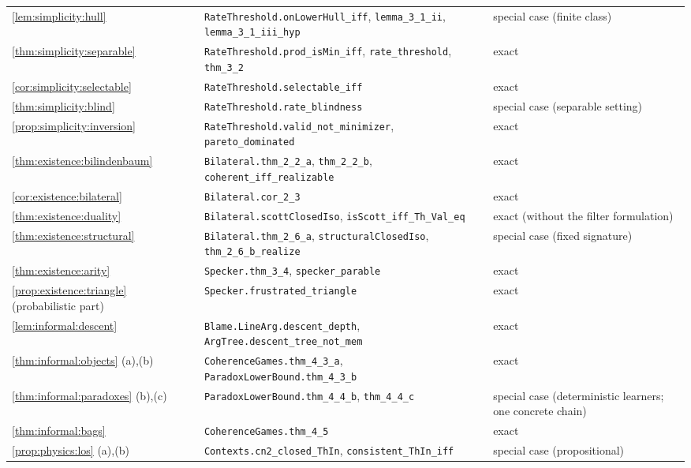 {\begin{longtable}{@{}>{\raggedright\arraybackslash}p{2.9cm}>{\raggedright\arraybackslash}p{7.6cm}>{\raggedright\arraybackslash}p{4.4cm}@{}}
\cref{lem:simplicity:hull} & \texttt{RateThreshold.\allowbreak onLowerHull\_iff}, \texttt{lemma\_3\_1\_ii}, \texttt{lemma\_3\_1\_iii\_hyp} & special case (finite class)\\
\cref{thm:simplicity:separable} & \texttt{RateThreshold.\allowbreak prod\_isMin\_iff}, \texttt{rate\_threshold}, \texttt{thm\_3\_2} & exact\\
\cref{cor:simplicity:selectable} & \texttt{RateThreshold.\allowbreak selectable\_iff} & exact\\
\cref{thm:simplicity:blind} & \texttt{RateThreshold.\allowbreak rate\_blindness} & special case (separable setting)\\
\cref{prop:simplicity:inversion} & \texttt{RateThreshold.\allowbreak valid\_not\_minimizer}, \texttt{pareto\_dominated} & exact\\
\cref{thm:existence:bilindenbaum} & \texttt{Bilateral.\allowbreak thm\_2\_2\_a}, \texttt{thm\_2\_2\_b}, \texttt{coherent\_iff\_realizable} & exact\\
\cref{cor:existence:bilateral} & \texttt{Bilateral.\allowbreak cor\_2\_3} & exact\\
\cref{thm:existence:duality} & \texttt{Bilateral.\allowbreak scottClosedIso}, \texttt{isScott\_iff\_Th\_Val\_eq} & exact (without the filter formulation)\\
\cref{thm:existence:structural} & \texttt{Bilateral.\allowbreak thm\_2\_6\_a}, \texttt{structuralClosedIso}, \texttt{thm\_2\_6\_b\_realize} & special case (fixed signature)\\
\cref{thm:existence:arity} & \texttt{Specker.\allowbreak thm\_3\_4}, \texttt{specker\_parable} & exact\\
\cref{prop:existence:triangle} (probabilistic part) & \texttt{Specker.\allowbreak frustrated\_triangle} & exact\\
\cref{lem:informal:descent} & \texttt{Blame.\allowbreak LineArg.descent\_depth}, \texttt{ArgTree.descent\_tree\_not\_mem} & exact\\
\cref{thm:informal:objects} (a),(b) & \texttt{CoherenceGames.\allowbreak thm\_4\_3\_a}, \texttt{ParadoxLowerBound.\allowbreak thm\_4\_3\_b} & exact\\
\cref{thm:informal:paradoxes} (b),(c) & \texttt{ParadoxLowerBound.\allowbreak thm\_4\_4\_b}, \texttt{thm\_4\_4\_c} & special case (deterministic learners; one concrete chain)\\
\cref{thm:informal:bags} & \texttt{CoherenceGames.\allowbreak thm\_4\_5} & exact\\
\cref{prop:physics:los} (a),(b) & \texttt{Contexts.\allowbreak cn2\_closed\_ThIn}, \texttt{consistent\_ThIn\_iff} & special case (propositional)\\

\end{longtable}}
